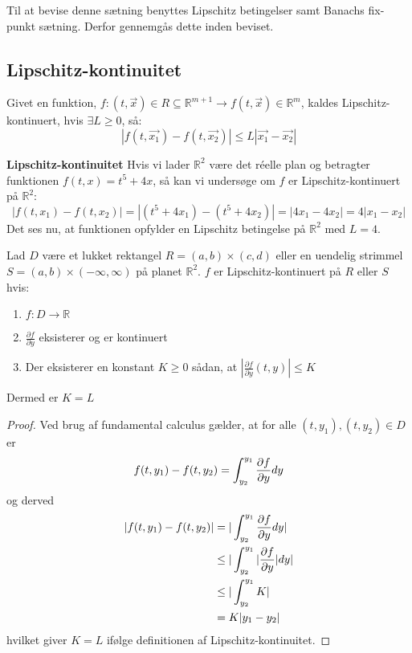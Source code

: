 Til at bevise denne sætning benyttes Lipschitz betingelser samt Banachs fix-punkt sætning. Derfor gennemgås dette inden beviset.

\subsection{Lipschitz-kontinuitet}
\begin{definition}
Givet en funktion, $f: (t,\vec{x})\in R \subseteq \mathbb{R}^{m+1} \rightarrow f(t,\vec{x}) \in \mathbb{R}^m$, kaldes Lipschitz-kontinuert, hvis $\exists L \geq 0$, så:
$$|f(t,\vec{x_1})-f(t,\vec{x_2})|\leq L|\vec{x_1}-\vec{x_2}|$$
\end{definition}

\begin{Example}\textbf{Lipschitz-kontinuitet}\hfill \break
\textnormal{Hvis vi lader $\mathbb{R}^2$ være det réelle plan og betragter funktionen $f(t,x)=t^5+4x$, så kan vi undersøge om $f$ er Lipschitz-kontinuert på $\mathbb{R}^2$:} \hfill \break
$$|f(t,x_1)-f(t,x_2)|=|(t^5+4x_1)-(t^5+4x_2)|=|4x_1-4x_2|=4|x_1-x_2|$$ \hfill \break
\textnormal{Det ses nu, at funktionen opfylder en Lipschitz betingelse på $\mathbb{R}^2$ med $L=4$.}
\end{Example}
\begin{lemma}{}{}
Lad $D$ være et lukket rektangel $R=(a,b)\times(c,d)$ eller en uendelig strimmel $S=(a,b)\times(-\infty,\infty)$ på planet $\mathbb{R}^2$. $f$ er Lipschitz-kontinuert på $R$ eller $S$ hvis:

\begin{enumerate}
    \item $f:D \rightarrow \mathbb{R}$
    \item $\frac{\partial f}{\partial y}$ eksisterer og er kontinuert
    \item Der eksisterer en konstant $K\geq 0$ sådan, at $|\frac{\partial f}{\partial y}(t,y)|\leq K$
\end{enumerate}

Dermed er $K=L$
\end{lemma}
\begin{proof} \hfill \break
Ved brug af fundamental calculus gælder, at for alle $(t,y_1),(t,y_2) \in D$ er
\begin{align}
 f(t,y_1)-f(t,y_2)=\int_{y_2}^{y_1}\frac{\partial f}{\partial y} dy \notag
\end{align}
og derved
\begin{align}
 |f(t,y_1)-f(t,y_2)|&=|\int_{y_2}^{y_1}\frac{\partial f}{\partial y} dy| \notag \\
&\leq |\int_{y_2}^{y_1}|\frac{\partial f}{\partial y}| dy| \notag\\
&\leq |\int_{y_2}^{y_1}K| \notag \\
&=K|y_1-y_2| \notag
\end{align}
hvilket giver $K=L$ ifølge definitionen af Lipschitz-kontinuitet. \qedhere
\end{proof}
\hfill \break

